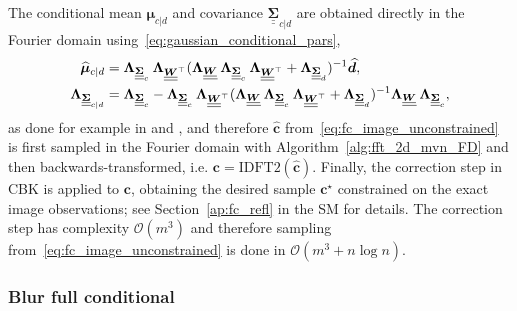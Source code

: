 \documentclass[12pt]{article}
\newcommand{\mybcirc}[1] {\underline{\underline{\bm{#1}}}}
\begin{document}
The conditional mean $\bm{\mu}_{c|d}$ and covariance $\mybcirc{\Sigma}_{c|d}$ are obtained directly in the Fourier domain using~\eqref{eq:gaussian_conditional_pars},
\begin{align}\label{eq:image_fc_unc_params_FD}
    \widehat{\bm{\mu}}_{c|d} &= \bm{\Lambda}_{\mybcirc{\Sigma}_c} \hspace*{0.07cm} \bm{\Lambda}_{\mybcirc{W}^{\top}} (\bm{\Lambda}_{\mybcirc{W}} \hspace*{0.07cm} \bm{\Lambda}_{\mybcirc{\Sigma}_c} \hspace*{0.07cm} \bm{\Lambda}_{\mybcirc{W}^{\top}} + \bm{\Lambda}_{\mybcirc{\Sigma}_d})^{-1} \widehat{\bm{d}}, \\
    \bm{\Lambda}_{\mybcirc{\Sigma}_{c|d}} &= \bm{\Lambda}_{\mybcirc{\Sigma}_c} - \bm{\Lambda}_{\mybcirc{\Sigma}_c} \hspace*{0.07cm} \bm{\Lambda}_{\mybcirc{W}^{\top}} (\bm{\Lambda}_{\mybcirc{W}} \hspace*{0.07cm} \bm{\Lambda}_{\mybcirc{\Sigma}_c} \hspace*{0.07cm} \bm{\Lambda}_{\mybcirc{W}^{\top}} + \bm{\Lambda}_{\mybcirc{\Sigma}_d})^{-1} \bm{\Lambda}_{\mybcirc{W}} \hspace*{0.07cm} \bm{\Lambda}_{\mybcirc{\Sigma}_c},
\end{align}
as done for example in \citet{BulandKolbjornsen2003} and \citet{orieux2010bayesian},
and therefore $\widehat{\bm{c}}$ from~\eqref{eq:fc_image_unconstrained} is first sampled in the Fourier domain with Algorithm~\ref{alg:fft_2d_mvn_FD} and then backwards-transformed, i.e. $\bm{c} = \mbox{IDFT2}(\hat{\bm{c}})$. Finally, the correction step in CBK is applied to $\bm{c}$, obtaining the desired sample $\bm{c}^{\star}$ constrained on the exact image observations; see Section~\ref{ap:fc_refl} in the SM for details. The correction step has complexity $\mathcal{O}(m^3)$ and therefore sampling from~\eqref{eq:fc_image_unconstrained} is done in $\mathcal{O}(m^3 + n \log n)$. 

\subsubsection{Blur full conditional}\label{sec:fc_blur}
\end{document}
